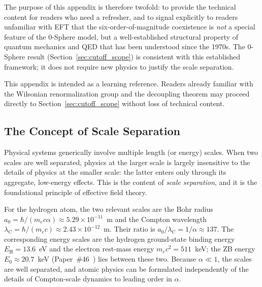 \documentclass[%
 reprint, amsmath,amssymb, aps, prb, ]{revtex4-2}
\numberwithin{equation}{section}
\newcommand{\lambdaC}{\lambda_{\mathrm{C}}}
\begin{document}
The purpose of this appendix is therefore twofold: to provide the technical content for readers who need a refresher, and to signal explicitly to readers unfamiliar with EFT that the six-order-of-magnitude coexistence is \emph{not} a special feature of the 0-Sphere model, but a well-established structural property of quantum mechanics and QED that has been understood since the 1970s. The 0-Sphere result (Section~\ref{sec:cutoff_scope}) is consistent with this established framework; it does not require new physics to justify the scale separation.

This appendix is intended as a learning reference. Readers already familiar with the Wilsonian renormalization group and the decoupling theorem may proceed directly to Section~\ref{sec:cutoff_scope} without loss of technical content.


\subsection{The Concept of Scale Separation}
\label{app:eft_scales}

Physical systems generically involve multiple length (or energy) scales. When two scales are well separated, physics at the larger scale is largely insensitive to the details of physics at the smaller scale: the latter enters only through its aggregate, low-energy effects. This is the content of \emph{scale separation}, and it is the foundational principle of effective field theory.

For the hydrogen atom, the two relevant scales are the Bohr radius $a_0 = \hbar/(m_e c \alpha) \approx 5.29\times10^{-11}$~m and the Compton wavelength $\lambdaC = \hbar/(m_e c) \approx 2.43\times10^{-12}$~m. Their ratio is $a_0/\lambdaC = 1/\alpha \approx 137$. The corresponding energy scales are the hydrogen ground-state binding energy $E_{\text{H}} = 13.6$~eV and the electron rest-mass energy $m_e c^2 = 511$~keV; the ZB energy $E_0 \approx 20.7$~keV (Paper~\#46~\cite{hanamura46}) lies between these two. Because $\alpha \ll 1$, the scales are well separated, and atomic physics can be formulated independently of the details of Compton-scale dynamics to leading order in $\alpha$.

\end{document}
